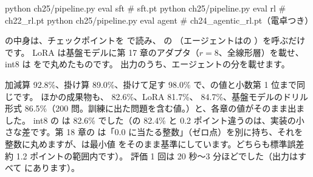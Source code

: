 \begin{textcode}
python ch25/pipeline.py eval sft     # sft.pt
python ch25/pipeline.py eval rl      # ch22_rl.pt
python ch25/pipeline.py eval agent   # ch24_agentic_rl.pt（電卓つき）
\end{textcode}

 の中身は、チェックポイントを  で読み、 の （エージェントはの ）を呼ぶだけです。
LoRA は基盤モデルに第 17 章のアダプタ（$r=8$、全線形層）を載せ、int8 は  をで丸めたものです。
出力のうち、エージェントの分を載せます。


加減算 92.8\%、掛け算 89.0\%、掛けて足す 98.0\% で、の値と小数第 1 位まで同じです。
ほかの成果物も、 82.6\%、LoRA 81.7\%、 84.7\%、基盤モデルのドリル形式 86.5\%（200 問。訓練に出た問題を含む値。）と、各章の値がそのまま出ました。
int8 の  は 82.6\% でした（の 82.4\% と 0.2 ポイント違うのは、実装の小さな差です。第 18 章の  は「0.0 に当たる整数」（ゼロ点）を別に持ち、それを整数に丸めますが、は最小値  をそのまま基準にしています。どちらも標準誤差 約 1.2 ポイントの範囲内です）。
評価 1 回は 20 秒〜3 分ほどでした（出力はすべて  にあります）。

